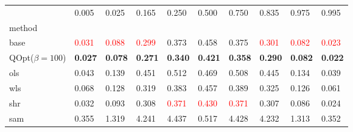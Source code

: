 \begin{tabular}{llllllllll}
\toprule
 & 0.005 & 0.025 & 0.165 & 0.250 & 0.500 & 0.750 & 0.835 & 0.975 & 0.995 \\
method &  &  &  &  &  &  &  &  &  \\
\midrule
base & \textcolor{red}{0.031} & \textcolor{red}{0.088} & \textcolor{red}{0.299} & 0.373 & 0.458 & 0.375 & \textcolor{red}{0.301} & \textcolor{red}{0.082} & \textcolor{red}{0.023} \\
\midrule
QOpt($\beta=100$) & \textbf{0.027} & \textbf{0.078} & \textbf{0.271} & \textbf{0.340} & \textbf{0.421} & \textbf{0.358} & \textbf{0.290} & \textbf{0.082} & \textbf{0.022} \\
ols & 0.043 & 0.139 & 0.451 & 0.512 & 0.469 & 0.508 & 0.445 & 0.134 & 0.039 \\
wls & 0.068 & 0.128 & 0.319 & 0.383 & 0.457 & 0.389 & 0.325 & 0.126 & 0.061 \\
shr & 0.032 & 0.093 & 0.308 & \textcolor{red}{0.371} & \textcolor{red}{0.430} & \textcolor{red}{0.371} & 0.307 & 0.086 & 0.024 \\
sam & 0.355 & 1.319 & 4.241 & 4.437 & 0.517 & 4.428 & 4.232 & 1.313 & 0.352 \\
\bottomrule
\end{tabular}